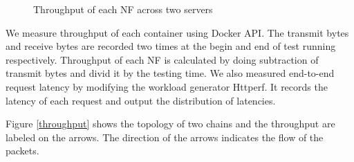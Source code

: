 \begin{figure}[!t]
\centering
{}
\hfil
{}
\hfil
\caption{Throughput of each NF across two servers}
\label{inter_throughput}
\end{figure}



We measure throughput of each container using Docker API. 
The transmit bytes and receive bytes are recorded two times 
at the begin and end of test running respectively. 
Throughput of each NF is calculated 
by doing subtraction of transmit bytes and divid it by the testing time. 
We also measured end-to-end request latency by modifying the workload generator Httperf. 
It records the latency of each request and output the distribution of latencies.

Figure \ref{throughput} shows the topology of two chains 
and the throughput are labeled on the arrows. 
The direction of the arrows indicates the flow of the packets.






